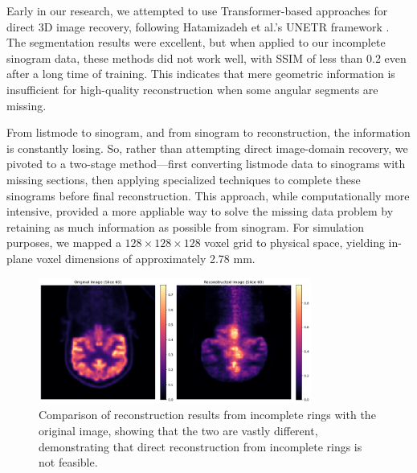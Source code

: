 \documentclass[12pt]{iopart}
\begin{document}
Early in our research, we attempted to use Transformer-based approaches for direct 3D image recovery, following Hatamizadeh et al.'s UNETR framework \cite{hatamizadeh2021unetrtransformers3dmedical}. The segmentation results were excellent, but when applied to our incomplete sinogram data, these methods did not work well, with SSIM of less than 0.2 even after a long time of training. This indicates that mere geometric information is insufficient for high-quality reconstruction when some angular segments are missing. 



From listmode to sinogram, and from sinogram to reconstruction, the information is constantly losing. So, rather than attempting direct image-domain recovery, we pivoted to a two-stage method—first converting listmode data to sinograms with missing sections, then applying specialized techniques to complete these sinograms before final reconstruction. This approach, while computationally more intensive, provided a more appliable way to solve the missing data problem by retaining as much information as possible from sinogram.
For simulation purposes, we mapped a $128\times128\times128$ voxel grid to physical space, yielding in-plane voxel dimensions of approximately 2.78 mm.


\begin{figure}[htbp]
    \centering
    \vspace{-0.2cm}
    \includegraphics[width=0.8\textwidth]{Images/output2}
    \vspace{-0.2cm}
    \caption{Comparison of reconstruction results from incomplete rings with the original image, showing that the two are vastly different, demonstrating that direct reconstruction from incomplete rings is not feasible.}
    \vspace{-0.2cm}
    \label{fig:pet_incomplete_reconstruction}
\end{figure}
\end{document}
